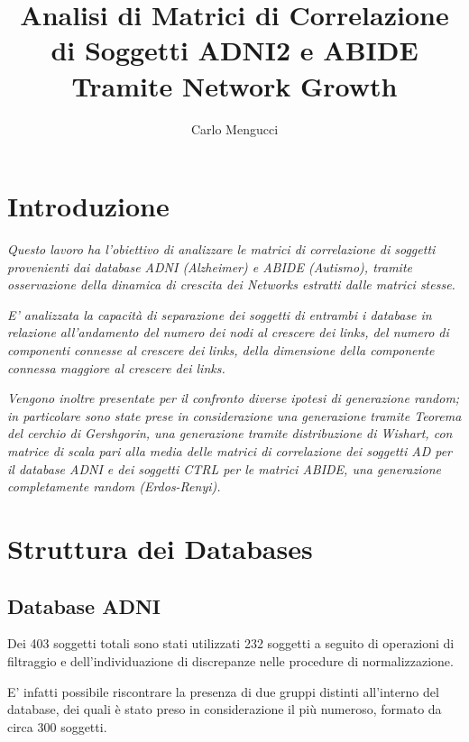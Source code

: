 \documentclass[12pt,openright,a4paper]{article}
\begin{document}
\title{Analisi di Matrici di Correlazione di Soggetti ADNI2 e ABIDE Tramite Network Growth}
\author{Carlo Mengucci}

\maketitle

\tableofcontents

\section{Introduzione}

\textit{Questo lavoro ha l'obiettivo di analizzare le matrici di correlazione di soggetti provenienti dai database ADNI (Alzheimer) e ABIDE (Autismo), tramite osservazione della dinamica di crescita dei Networks estratti dalle matrici stesse.}

\textit{E' analizzata la capacità di separazione dei soggetti di entrambi i database in relazione  all'andamento del numero dei nodi al crescere dei links, del numero di componenti connesse al crescere dei links, della dimensione della componente connessa maggiore al crescere dei links.}

\textit{Vengono inoltre presentate per il confronto diverse ipotesi di generazione random; in particolare sono state prese in considerazione una generazione tramite Teorema del cerchio di Gershgorin, una generazione tramite distribuzione di Wishart, con matrice di scala pari alla media delle matrici di correlazione dei soggetti AD per il database ADNI e dei soggetti CTRL per le matrici ABIDE, una generazione completamente random (Erdos-Renyi).}

\section{Struttura dei Databases}

\subsection{Database ADNI}

Dei 403 soggetti totali sono stati utilizzati 232 soggetti a seguito di operazioni di filtraggio e dell'individuazione di discrepanze nelle procedure di normalizzazione. 

E' infatti possibile riscontrare la presenza di due gruppi distinti all'interno del database, dei quali è stato preso in considerazione il più numeroso, formato da circa 300 soggetti.
\end{document}
